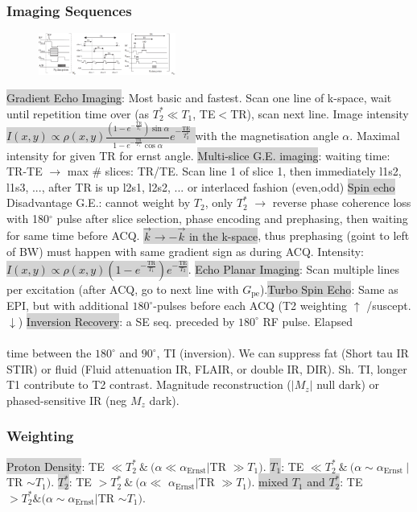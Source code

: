 \documentclass[9pt]{article}
\newcommand{\grey}[1]{\setlength{\fboxsep}{0pt}\colorbox{lightgrey}{#1}}
\begin{document}
\begin{multicols}{2}
\subsubsection{Imaging Sequences}
\vspace{-4.5mm}
\begin{figure}[H]
	\includegraphics[width=0.4\textwidth]{sequences.png}
\end{figure}
\vspace{-5mm}
\grey{Gradient Echo Imaging}: Most basic and fastest. Scan one line of k-space, wait until repetition time over (as $T_2^* \ll T_1$, TE$<$TR), scan next line. Image intensity 
\grey{$I(x,y) \propto \rho(x,y)\frac{(1-e^{-\frac{\mathrm{TR}}{T_1}})\sin\alpha}{1-e^{-\frac{\mathrm{TR}}{T_1}}\cos\alpha}e^{-\frac{\mathrm{TE}}{T_2^*}}$ }
with the magnetisation angle $\alpha$. Maximal intensity for given TR for ernst angle.
\grey{Multi-slice G.E. imaging}: waiting time: TR-TE $\rightarrow$ max $\#$ slices: TR/TE. Scan line 1 of slice 1, then immediately l1s2, l1s3, ..., after TR is up l2s1, l2s2, ... or interlaced fashion (even,odd)
\grey{Spin echo} Disadvantage G.E.: cannot weight by $T_2$, only $T_2^*$ $\rightarrow$ reverse phase coherence loss with 180${}^\circ$ pulse after slice selection, phase encoding and prephasing, then waiting for same time before ACQ. \grey{$\vec k \rightarrow -\vec k$ in the k-space}, thus prephasing (goint to left of BW) must happen with same gradient sign as during ACQ. Intensity: \grey{$I(x,y) \propto \rho (x,y)(1-e^{-\frac{\mathrm{TR}}{T_1}})e^{-\frac{\mathrm{TE}}{T_2}}$}. \grey{Echo Planar Imaging}: Scan multiple lines per excitation (after ACQ, go to next line with $G_\mathrm{pe}$).\grey{Turbo Spin Echo}: Same as EPI, but with additional $180^\circ$-pulses before each ACQ (T2 weighting $\uparrow$ /suscept. $\downarrow$) \grey{Inversion Recovery}: a SE seq. preceded by $180^\circ$ RF pulse. Elapsed \\
\\
time between the $180^\circ$ and $90^\circ$, TI (inversion). We can suppress fat (Short tau IR STIR) or fluid (Fluid attenuation IR, FLAIR, or double IR, DIR). Sh. TI, longer T1 contribute to T2 contrast. Magnitude reconstruction ($|M_z|$ null dark)  or phased-sensitive IR (neg $M_z$ dark).
\subsubsection{Weighting} 
\grey{Proton Density}: TE $\ll T_2^* \ \& \ (\alpha \ll \alpha_\mathrm{Ernst} | $TR $\gg T_1)$. \grey{$T_1$}: TE $\ll T_2^* \ \& \ (\alpha \sim \alpha_\mathrm{Ernst} \ | \ $ TR $ \sim T_1)$. \grey{$T_2^*$}: TE $> T_2^* \ \& \ (\alpha \ll$ 
$\alpha_\mathrm{Ernst} | $TR $\gg T_1)$. 
\grey{mixed $T_1$ and $T_2^*$}: TE $> T_2^* \&	(\alpha \sim \alpha_\mathrm{Ernst}|$TR $ \sim T_1)$.


\end{multicols}
\end{document}
